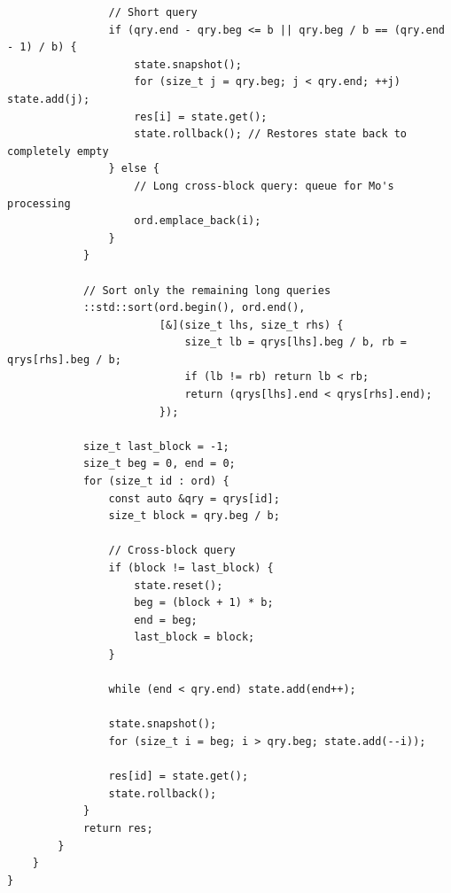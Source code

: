 \documentclass[UTF8]{article}
\begin{document}
\begin{verbatim}
				// Short query
				if (qry.end - qry.beg <= b || qry.beg / b == (qry.end - 1) / b) {
					state.snapshot();
					for (size_t j = qry.beg; j < qry.end; ++j) state.add(j);
					res[i] = state.get();
					state.rollback(); // Restores state back to completely empty
				} else {
					// Long cross-block query: queue for Mo's processing
					ord.emplace_back(i);
				}
			}

			// Sort only the remaining long queries
			::std::sort(ord.begin(), ord.end(),
						[&](size_t lhs, size_t rhs) {
							size_t lb = qrys[lhs].beg / b, rb = qrys[rhs].beg / b;
							if (lb != rb) return lb < rb;
							return (qrys[lhs].end < qrys[rhs].end);
						});

			size_t last_block = -1;
			size_t beg = 0, end = 0;
			for (size_t id : ord) {
				const auto &qry = qrys[id];
				size_t block = qry.beg / b;

				// Cross-block query
				if (block != last_block) {
					state.reset();
					beg = (block + 1) * b;
					end = beg;
					last_block = block;
				}

				while (end < qry.end) state.add(end++);

				state.snapshot();
				for (size_t i = beg; i > qry.beg; state.add(--i));

				res[id] = state.get();
				state.rollback();
			}
			return res;
		}
	}
}
\end{verbatim}
\end{document}
